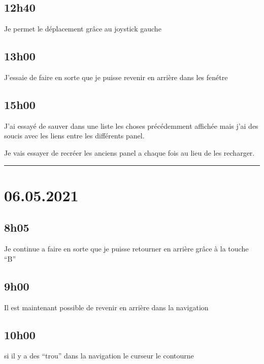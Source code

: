 \documentclass[a4paper,12pt,french]{sphinxmanual}
\begin{document}
\subsection{12h40}
\label{\detokenize{logbook:id73}}
\sphinxAtStartPar
Je permet le déplacement grâce au joystick gauche


\subsection{13h00}
\label{\detokenize{logbook:id74}}
\sphinxAtStartPar
J’essaie de faire en sorte que je puisse revenir en arrière dans les fenétre


\subsection{15h00}
\label{\detokenize{logbook:id75}}
\sphinxAtStartPar
J’ai essayé de sauver dans une liste les choses précédemment affichée mais j’ai des soucis avec les liens entre les différents panel.

\sphinxAtStartPar
Je vais essayer de recréer les anciens panel a chaque fois au lieu de les recharger.


\bigskip\hrule\bigskip



\section{06.05.2021}
\label{\detokenize{logbook:id76}}

\subsection{8h05}
\label{\detokenize{logbook:id77}}
\sphinxAtStartPar
Je continue a faire en sorte que je puisse retourner en arrière grâce à la touche “B”


\subsection{9h00}
\label{\detokenize{logbook:id78}}
\sphinxAtStartPar
Il est maintenant possible de revenir en arrière dans la navigation


\subsection{10h00}
\label{\detokenize{logbook:id79}}
\sphinxAtStartPar
si il y a des “trou” dans la navigation le curseur le contourne
\end{document}
